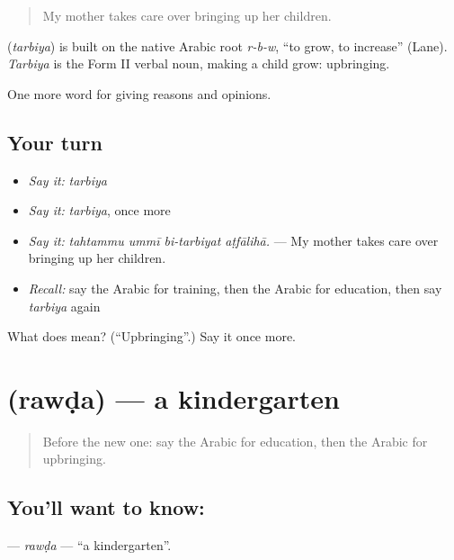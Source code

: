 \begin{quote}
My mother takes care over bringing up her children.
\end{quote}

\begin{cousinweb}
\textbf{} (\emph{tarbiya}) is built on the native Arabic root \emph{r-b-w}, \textquotedblleft{}to grow, to increase\textquotedblright{} (Lane). \emph{Tarbiya} is the Form II verbal noun, making a child grow: upbringing.
\end{cousinweb}

\begin{grammarlens}[title={What you've built}]
One more word for giving reasons and opinions.
\end{grammarlens}

\subsection*{Your turn}
\begin{itemize}
\raggedright
  \item \emph{Say it:} \emph{tarbiya}
  \item \emph{Say it:} \emph{tarbiya}, once more
  \item \emph{Say it:} \emph{tahtammu ummī bi-tarbiyat aṭfālihā.} — My mother takes care over bringing up her children.
  \item \emph{Recall:} say the Arabic for training, then the Arabic for education, then say \emph{tarbiya} again
\end{itemize}

\begin{tcolorbox}[breakable,colback=teal!4,colframe=teal!35!black,title={Before you move on}]
What does  mean? (\textquotedblleft{}Upbringing\textquotedblright{}.) Say it once more.
\end{tcolorbox}
\section[\texorpdfstring{\ar{روضة} (rawḍa)}{روضة (rawḍa)}]{ (rawḍa) — a kindergarten}

\label{lesson:AR-C398-rawda}



\begin{quote}
Before the new one: say the Arabic for education, then the Arabic for upbringing.
\end{quote}

\subsection*{You'll want to know: }
\textbf{} — \emph{rawḍa} — \textquotedblleft{}a kindergarten\textquotedblright{}.

